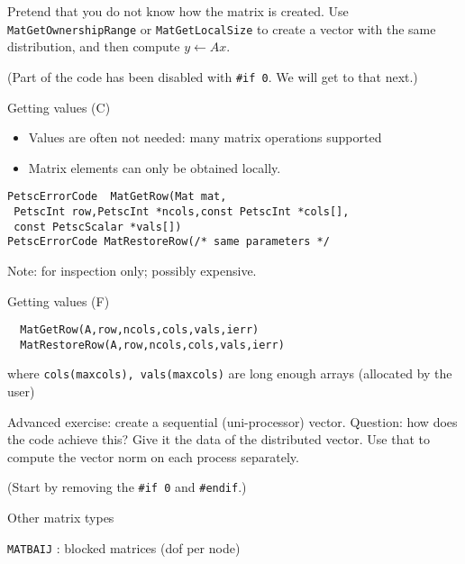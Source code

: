 \begin{exerciseframe}[matvec]
  Pretend that you do not know how the matrix is created. Use
  \lstinline{MatGetOwnershipRange} or \lstinline{MatGetLocalSize} to create a vector
  with the same distribution, and then compute $y\leftarrow Ax$.

  (Part of the code has been disabled with \verb+#if 0+. We will get
  to that next.)
\end{exerciseframe}

\begin{details}
\begin{numberedframe}{Getting values (C)}
  \begin{itemize}
  \item Values are often not needed: many matrix operations supported
  \item Matrix elements can only be obtained locally.
  \end{itemize}
\begin{lstlisting}
PetscErrorCode  MatGetRow(Mat mat,
 PetscInt row,PetscInt *ncols,const PetscInt *cols[],
 const PetscScalar *vals[])
PetscErrorCode MatRestoreRow(/* same parameters */
\end{lstlisting}
Note: for inspection only; possibly expensive.
\end{numberedframe}

\begin{fortran}
\begin{numberedframe}{Getting values (F)}
\begin{lstlisting}
  MatGetRow(A,row,ncols,cols,vals,ierr)
  MatRestoreRow(A,row,ncols,cols,vals,ierr)
\end{lstlisting}
where \lstinline{cols(maxcols), vals(maxcols)} are long enough arrays
(allocated by the user)
\end{numberedframe}
\end{fortran}

\begin{exerciseframe}[matvec]
  Advanced exercise: create a sequential (uni-processor)
  vector. Question: how does the code achieve this?
  Give it the data of the distributed vector. Use that to compute the
  vector norm on each process separately.

  (Start by removing the \verb+#if 0+ and \verb+#endif+.)
\end{exerciseframe}

\begin{numberedframe}{Other matrix types}

\lstinline{MATBAIJ} : blocked matrices (dof per node)


\end{numberedframe}
\end{details}
